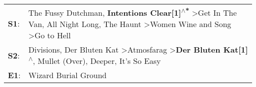 \begin{supertabular}{p{0.03\textwidth}p{0.92\textwidth}}
 \textbf{S1}:  &  The Fussy Dutchman\textsuperscript{}, \enspace \textbf{Intentions Clear[1]\textsuperscript{$\wedge$*}} \textgreater \enspace Get In The Van\textsuperscript{}, \enspace All Night Long\textsuperscript{}, \enspace The Haunt\textsuperscript{} \textgreater \enspace Women Wine and Song\textsuperscript{} \textgreater \enspace Go to Hell\textsuperscript{}  \enspace  \\
 \textbf{S2}:  &                                     Divisions\textsuperscript{}, \enspace Der Bluten Kat\textsuperscript{} \textgreater \enspace Atmosfarag\textsuperscript{} \textgreater \enspace \textbf{Der Bluten Kat[1]\textsuperscript{$\wedge$}}, \enspace Mullet (Over)\textsuperscript{}, \enspace Deeper\textsuperscript{}, \enspace It's So Easy\textsuperscript{}  \enspace  \\
 \textbf{E1}:  &                                                                                                                                                                                                                                                                                                                         Wizard Burial Ground\textsuperscript{}  \enspace  \\
\end{supertabular}
